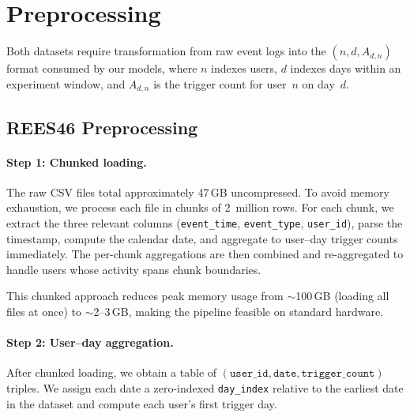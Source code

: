 \section{Preprocessing}
\label{sec:preprocessing}

Both datasets require transformation from raw event logs into the
$(n, d, A_{d,n})$ format consumed by our models, where $n$ indexes
users, $d$ indexes days within an experiment window, and $A_{d,n}$
is the trigger count for user~$n$ on day~$d$.

\subsection{REES46 Preprocessing}
\label{subsec:rees46_preprocessing}

\paragraph{Step 1: Chunked loading.}
The raw CSV files total approximately 47\,GB uncompressed.
To avoid memory exhaustion, we process each file in chunks of
2~million rows.
For each chunk, we extract the three relevant columns
(\texttt{event\_time}, \texttt{event\_type}, \texttt{user\_id}),
parse the timestamp, compute the calendar date, and aggregate
to user--day trigger counts immediately.
The per-chunk aggregations are then combined and re-aggregated
to handle users whose activity spans chunk boundaries.

This chunked approach reduces peak memory usage from
$\sim$100\,GB (loading all files at once) to $\sim$2--3\,GB,
making the pipeline feasible on standard hardware.

\paragraph{Step 2: User--day aggregation.}
After chunked loading, we obtain a table of
$(\texttt{user\_id}, \texttt{date}, \texttt{trigger\_count})$
triples.
We assign each date a zero-indexed \texttt{day\_index}
relative to the earliest date in the dataset and compute
each user's first trigger day.

